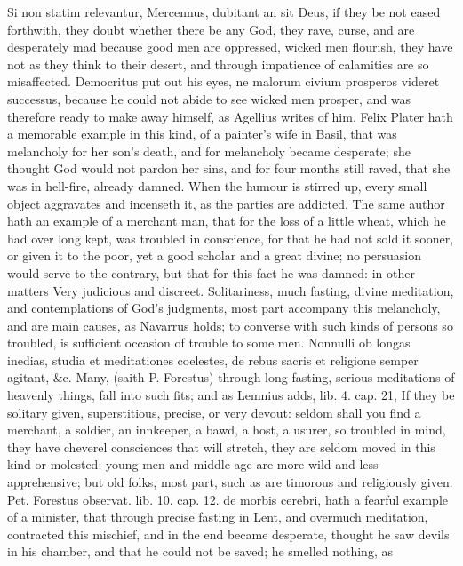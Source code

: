 {Si non statim relevantur, Mercennus, dubitant an sit Deus, if
they be not eased forthwith, they doubt whether there be any God, they
rave, curse, and are desperately mad because good men are oppressed,
wicked men flourish, they have not as they think to their desert, and
through impatience of calamities are so misaffected. Democritus put out
his eyes, ne malorum civium prosperos videret successus, because he
could not abide to see wicked men prosper, and was therefore ready to
make away himself, as Agellius writes of him. Felix Plater hath a
memorable example in this kind, of a painter's wife in Basil, that was
melancholy for her son's death, and for melancholy became desperate;
she thought God would not pardon her sins, and for four months
still raved, that she was in hell-fire, already damned. When the humour
is stirred up, every small object aggravates and incenseth it, as the
parties are addicted. The same author hath an example of a
merchant man, that for the loss of a little wheat, which he had over
long kept, was troubled in conscience, for that he had not sold it
sooner, or given it to the poor, yet a good scholar and a great divine;
no persuasion would serve to the contrary, but that for this fact he
was damned: in other matters Very judicious and discreet. Solitariness,
much fasting, divine meditation, and contemplations of God's judgments,
most part accompany this melancholy, and are main causes, as
Navarrus holds; to converse with such kinds of persons so
troubled, is sufficient occasion of trouble to some men. Nonnulli ob
longas inedias, studia et meditationes coelestes, de rebus sacris et
religione semper agitant, \&c. Many, (saith P. Forestus) through long
fasting, serious meditations of heavenly things, fall into such fits;
and as Lemnius adds, lib. 4. cap. 21, If they be solitary given,
superstitious, precise, or very devout: seldom shall you find a
merchant, a soldier, an innkeeper, a bawd, a host, a usurer, so
troubled in mind, they have cheverel consciences that will stretch,
they are seldom moved in this kind or molested: young men and middle
age are more wild and less apprehensive; but old folks, most part, such
as are timorous and religiously given. Pet. Forestus observat. lib. 10.
cap. 12. de morbis cerebri, hath a fearful example of a minister, that
through precise fasting in Lent, and overmuch meditation, contracted
this mischief, and in the end became desperate, thought he saw devils
in his chamber, and that he could not be saved; he smelled nothing, as
}
